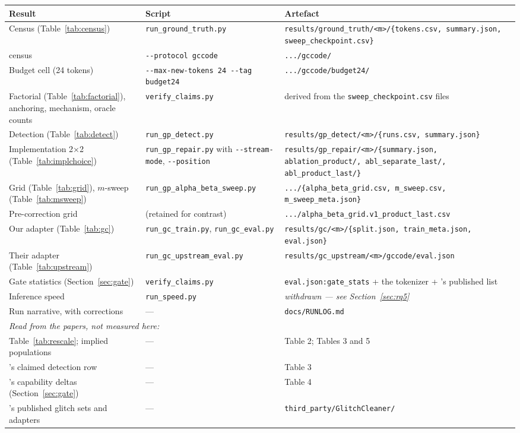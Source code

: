 \begin{longtable}{p{4.4cm}p{4.6cm}p{5.0cm}}
\toprule
\textbf{Result} & \textbf{Script} & \textbf{Artefact} \\
\midrule
\endhead
Census (Table~\ref{tab:census}) & \texttt{run\_ground\_truth.py} & \texttt{results/ground\_truth/<m>/\{tokens.csv, summary.json, sweep\_checkpoint.csv\}} \\
\Pcode{} census & \texttt{-{}-protocol gccode} & \texttt{.../gccode/} \\
Budget cell (24 tokens) & \texttt{-{}-max-new-tokens 24 -{}-tag budget24} & \texttt{.../gccode/budget24/} \\
Factorial (Table~\ref{tab:factorial}), anchoring, mechanism, oracle counts & \texttt{verify\_claims.py} & derived from the \texttt{sweep\_checkpoint.csv} files \\
Detection (Table~\ref{tab:detect}) & \texttt{run\_gp\_detect.py} & \texttt{results/gp\_detect/<m>/\{runs.csv, summary.json\}} \\
Implementation 2$\times$2 (Table~\ref{tab:implchoice}) & \texttt{run\_gp\_repair.py} with \texttt{-{}-stream-mode}, \texttt{-{}-position} & \texttt{results/gp\_repair/<m>/\{summary.json, ablation\_product/, abl\_separate\_last/, abl\_product\_last/\}} \\
Grid (Table~\ref{tab:grid}), $m$-sweep (Table~\ref{tab:msweep}) & \texttt{run\_gp\_alpha\_beta\_sweep.py} & \texttt{.../\{alpha\_beta\_grid.csv, m\_sweep.csv, m\_sweep\_meta.json\}} \\
Pre-correction grid & (retained for contrast) & \texttt{.../alpha\_beta\_grid.v1\_product\_last.csv} \\
Our adapter (Table~\ref{tab:gc}) & \texttt{run\_gc\_train.py}, \texttt{run\_gc\_eval.py} & \texttt{results/gc/<m>/\{split.json, train\_meta.json, eval.json\}} \\
Their adapter (Table~\ref{tab:upstream}) & \texttt{run\_gc\_upstream\_eval.py} & \texttt{results/gc\_upstream/<m>/gccode/eval.json} \\
Gate statistics (Section~\ref{sec:gate}) & \texttt{verify\_claims.py} & \texttt{eval.json:gate\_stats} + the tokenizer + \gc{}'s published list \\
Inference speed & \texttt{run\_speed.py} & \emph{withdrawn --- see Section~\ref{sec:rq5}} \\
Run narrative, with corrections & --- & \texttt{docs/RUNLOG.md} \\
\midrule
\multicolumn{3}{l}{\emph{Read from the papers, not measured here:}} \\
Table~\ref{tab:rescale}; implied populations & --- & \gc{} Table 2; \gp{} Tables 3 and 5 \\
\gp{}'s claimed detection row & --- & \gp{} Table 3 \\
\gc{}'s capability deltas (Section~\ref{sec:gate}) & --- & \gc{} Table 4 \\
\gc{}'s published glitch sets and adapters & --- & \texttt{third\_party/GlitchCleaner/} \\
\bottomrule
\end{longtable}

